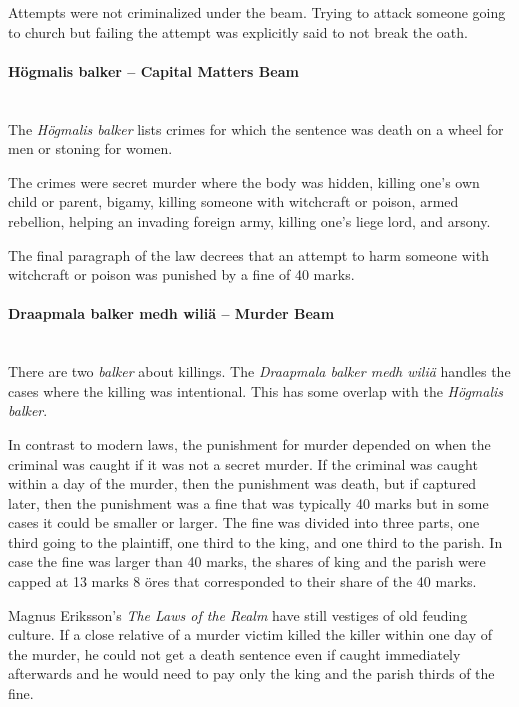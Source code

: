 \documentclass[a4paper]{article}
\begin{document}
Attempts were not criminalized under the beam. Trying to attack
someone going to church but failing the attempt was explicitly said to
not break the oath.

\paragraph {Högmalis balker – Capital Matters Beam} \mbox{}\\

The \emph{Högmalis balker} lists crimes for which the sentence was
death on a wheel for men or stoning for women.

The crimes were secret murder where the body was hidden, killing one's
own child or parent, bigamy, killing someone with witchcraft or
poison, armed rebellion, helping an invading foreign army, killing
one's liege lord, and arsony.

The final paragraph of the law decrees that an attempt to harm someone
with witchcraft or poison was punished by a fine of 40 marks.


\paragraph {Draapmala balker medh wiliä – Murder Beam} \mbox{}\\

There are two \emph{balker} about killings. The \emph{Draapmala balker
  medh wiliä} handles the cases where the killing was intentional.
This has some overlap with the \emph{Högmalis balker}.

In contrast to modern laws, the punishment for murder depended on when
the criminal was caught if it was not a secret murder. If the criminal
was caught within a day of the murder, then the punishment was death,
but if captured later, then the punishment was a fine that was
typically 40 marks but in some cases it could be smaller or larger.
The fine was divided into three parts, one third going to the
plaintiff, one third to the king, and one third to the parish. In case
the fine was larger than 40 marks, the shares of king and the parish
were capped at 13 marks 8 öres that corresponded to their share of the
40 marks.

Magnus Eriksson's \emph{The Laws of the Realm} have still vestiges of
old feuding culture. If a close relative of a murder victim killed the
killer within one day of the murder, he could not get a death sentence
even if caught immediately afterwards and he would need to pay only
the king and the parish thirds of the fine.
\end{document}
